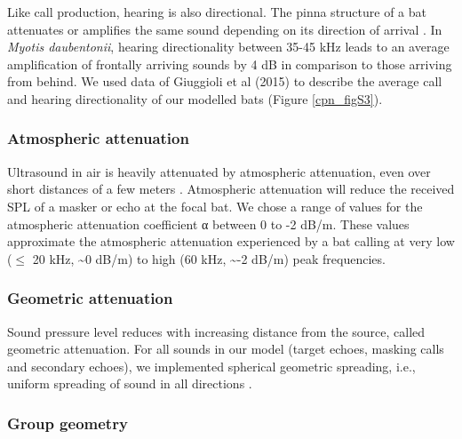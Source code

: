 \documentclass[
]{book}
\begin{document}
Like call production, hearing is also directional. The pinna structure of a bat
attenuates or amplifies the same sound depending on its direction of arrival \citep[\citet{f2008a}]{firzlaff2003a}. In \emph{Myotis daubentonii}, hearing directionality between 35-45 kHz leads to an average amplification of frontally arriving sounds by 4 dB in comparison to those arriving from behind. We used data of Giuggioli et al (2015) to describe the average call and hearing directionality of our modelled bats (Figure \ref{cpn_figS3}).

\hypertarget{atmospheric-attenuation}{%
\subsubsection{\texorpdfstring{Atmospheric attenuation \label{cpn_atmabs}}{Atmospheric attenuation }}\label{atmospheric-attenuation}}

Ultrasound in air is heavily attenuated by atmospheric attenuation, even over short distances of a few meters \citep[\citet{lawrence1982a}]{h2018a}. Atmospheric attenuation will reduce the received SPL of a masker or echo at the focal bat. We chose a range of values for the atmospheric attenuation coefficient α between 0 to -2 dB/m. These values approximate the atmospheric attenuation experienced by a bat calling at very low (\(\leq\) 20 kHz, \textasciitilde0 dB/m) to high (60 kHz, \textasciitilde-2 dB/m) peak frequencies.

\hypertarget{geometric-attenuation}{%
\subsubsection{\texorpdfstring{Geometric attenuation \label{cpn_geomattn}}{Geometric attenuation }}\label{geometric-attenuation}}

Sound pressure level reduces with increasing distance from the source, called
geometric attenuation. For all sounds in our model (target echoes, masking calls
and secondary echoes), we implemented spherical geometric spreading, i.e.,
uniform spreading of sound in all directions \citep{speaks1996a}.

\hypertarget{group-geometry}{%
\subsubsection{\texorpdfstring{Group geometry \label{cpn_groupgeom}}{Group geometry }}\label{group-geometry}}
\end{document}
